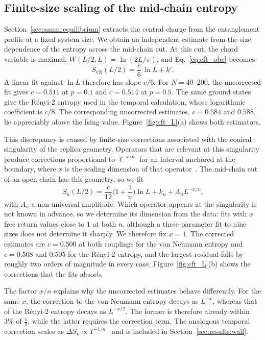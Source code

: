 \subsection{Finite-size scaling of the mid-chain entropy}
\label{app:fss}

Section~\ref{sec:annni:equilibrium} extracts the central charge from the entanglement profile at a fixed system size. We obtain an independent estimate from the size dependence of the entropy across the mid-chain cut. At this cut, the chord variable is maximal, $W(L/2,L)=\ln(2L/\pi)$, and Eq.~\eqref{eq:cft_obc} becomes
\begin{equation}
  S_{\mathrm{vN}}(L/2) = \frac{c}{6}\,\ln L + k'.
  \label{eq:cft_mid}
\end{equation}
A linear fit against $\ln L$ therefore has slope $c/6$. For $N=40$--$200$, the uncorrected fit gives $c=0.511$ at $p=0.1$ and $c=0.514$ at $p=0.5$. The same ground states give the R\'enyi-2 entropy used in the temporal calculation, whose logarithmic coefficient is $c/8$. The corresponding uncorrected estimates, $c=0.584$ and $0.588$, lie appreciably above the Ising value. Figure~\ref{fig:cft_L}(a) shows both estimators.

This discrepancy is caused by finite-size corrections associated with the conical singularity of the replica geometry. Operators that are relevant at this singularity produce corrections proportional to $\ell^{-x/n}$ for an interval anchored at the boundary, where $x$ is the scaling dimension of that operator~\cite{cardy_calabrese2010}. The mid-chain cut of an open chain has this geometry, so we fit
\begin{equation}
  S_n(L/2)
  = \frac{c}{12}\Big(1+\frac1n\Big)\ln L
  + k_n + A_n L^{-x/n}.
  \label{eq:cft_mid_corr}
\end{equation}
with $A_n$ a non-universal amplitude. Which operator appears at the singularity is not known in advance, so we determine its dimension from the data: fits with $x$ free return values close to $1$ at both $n$, although a three-parameter fit to nine sizes does not determine it sharply. We therefore fix $x=1$. The corrected estimates are $c=0.500$ at both couplings for the von Neumann entropy and $c=0.508$ and $0.505$ for the R\'enyi-2 entropy, and the largest residual falls by roughly two orders of magnitude in every case. Figure~\ref{fig:cft_L}(b) shows the corrections that the fits absorb.

The factor $x/n$ explains why the uncorrected estimates behave differently. For the same $x$, the correction to the von Neumann entropy decays as $L^{-x}$, whereas that of the R\'enyi-2 entropy decays as $L^{-x/2}$. The former is therefore already within $3\%$ of $\tfrac12$, while the latter requires the correction term. The analogous temporal correction scales as $\Delta S_n\propto T^{-1/n}$~\cite{boucomas2026} and is included in Section~\ref{sec:results:wall}.


